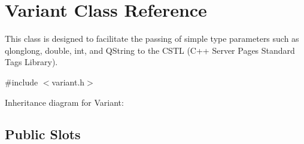 \hypertarget{class_variant}{}\section{Variant Class Reference}
\label{class_variant}


This class is designed to facilitate the passing of simple type parameters such as qlonglong, double, int, and Q\+String to the C\+S\+TL (C++ Server Pages Standard Tags Library).  




{\ttfamily \#include $<$variant.\+h$>$}



Inheritance diagram for Variant\+:
\subsection*{Public Slots}
